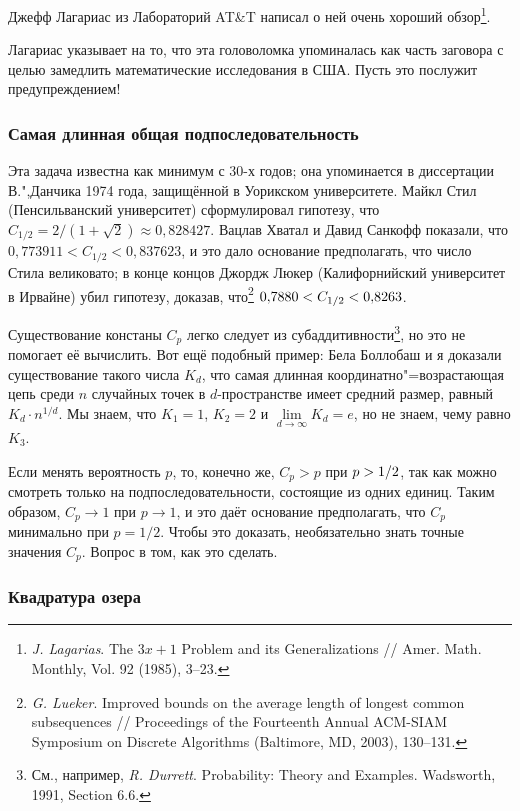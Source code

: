 \documentclass[twoside]{book}
\begin{document}
Джефф Лагариас из Лабораторий AT\&T написал о ней очень хороший
обзор\footnote{\emph{J. Lagarias}. The $3x+1$ Problem and its Generalizations /\!/ {Amer. Math. Monthly}, Vol. 92 (1985), 3--23.%
}.

Лагариас указывает на то, что эта головоломка упоминалась как часть заговора с целью замедлить математические исследования в США.
Пусть это послужит предупреждением!

\subsubsection*{Самая длинная общая подпоследовательность}

Эта задача известна как минимум с 30-х годов;
она упоминается в диссертации В.",Данчика 1974 года, защищённой в Уорикском университете.
\mbox{Майкл} Стил (Пенсильванский университет) сформулировал гипотезу, что $C_{1/2} = 2/(1+\sqrt{2})\approx 0{,}828427$.
Вацлав Хватал и Давид Санкофф показали, что $0{,}773911 < C_{1/2} < 0{,}837623$, и это дало основание предполагать, что число Стила великовато;
в конце концов Джордж Люкер (Калифорнийский университет в Ирвайне) убил гипотезу, доказав, что\footnote{
\emph{G. Lueker}. 
Improved bounds on the average length of longest common subsequences /\!/ {Proceedings of the Fourteenth Annual ACM-SIAM Symposium on Discrete Algorithms} (Baltimore, MD, 2003), 130–131.}
$0{,}7880 \z< C_{1/2} \z< 0{,}8263$.

Существование констаны $C_p$ легко следует из субаддитивности\footnote{См., например, \emph{R. Durrett}. {Probability: Theory and Examples}. Wadsworth, 1991, Section 6.6.}, но это не помогает её вычислить.
Вот ещё подобный пример: Бела Боллобаш и я доказали существование такого числа $K_d$, что самая длинная координатно"=возрастающая цепь среди $n$ случайных точек в $d$-пространстве имеет средний размер, равный $K_d\cdot n^{1/d}$.
Мы знаем, что $K_1=1$, $K_2=2$ и $\lim\limits_{d\to\infty} K_d=e$, но не знаем, чему равно $K_3$.

Если менять вероятность $p$, то, конечно же, $C_p>p$ при $p \z> 1/2$, так как можно смотреть только на подпоследовательности, состоящие из одних единиц.
Таким образом, $C_p\to 1$ при $p\to 1$, и это даёт основание предполагать, что $C_p$ минимально при $p=1/2$.
Чтобы это доказать, необязательно знать точные значения $C_p$.
Вопрос в том, как это сделать.

\subsubsection*{Квадратура озера}
\end{document}
